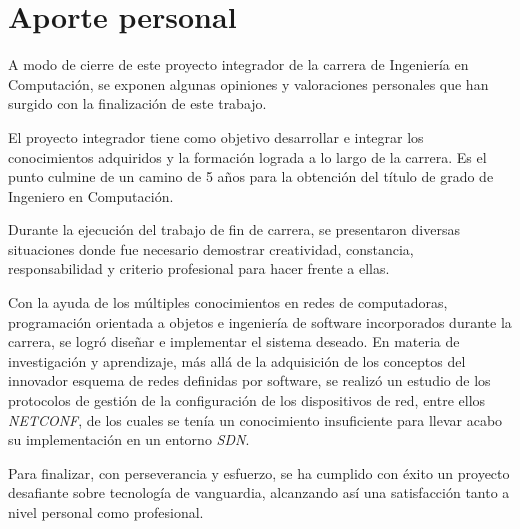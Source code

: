 \section{Aporte personal}

A modo de cierre de este proyecto integrador de la carrera de Ingeniería en Computación, se exponen algunas opiniones y valoraciones personales que han surgido con la finalización de este trabajo.

El proyecto integrador tiene como objetivo desarrollar e integrar los conocimientos adquiridos y la formación lograda a lo largo de la carrera. Es el punto culmine de un camino de 5 años para la obtención del título de grado de Ingeniero en Computación.

Durante la ejecución del trabajo de fin de carrera, se presentaron diversas situaciones donde fue necesario demostrar creatividad, constancia, responsabilidad y criterio profesional para hacer frente a ellas.   

Con la ayuda de los múltiples conocimientos en redes de computadoras, programación orientada a objetos e ingeniería de software incorporados durante la carrera, se logró diseñar e implementar el sistema deseado. En materia de investigación y aprendizaje, más allá de la adquisición de los conceptos del innovador esquema de redes definidas por software, se realizó un estudio de los protocolos de gestión de la configuración de los dispositivos de red, entre ellos \textit{NETCONF}, de los cuales se tenía un conocimiento insuficiente para llevar acabo su implementación en un entorno \textit{SDN}.

Para finalizar, con perseverancia y esfuerzo, se ha cumplido con éxito un proyecto desafiante sobre tecnología de vanguardia, alcanzando así una satisfacción tanto a nivel personal como profesional. 